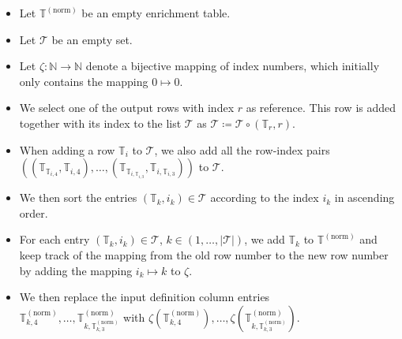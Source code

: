 \begin{itemize}
  \item Let $\mathbb{T}^{(\text{norm})}$ be an empty enrichment table.
  \item Let $\mathcal{T}$ be an empty set.
  \item Let $\zeta \colon \mathbb{N} \to \mathbb{N}$ denote a bijective mapping of index numbers, which initially only contains the mapping $0 \mapsto 0$.
  \item We select one of the output rows with index $r$ as reference. This row is added together with its index to the list $\mathcal{T}$ as $\mathcal{T} \coloneq \mathcal{T}\circ (\mathbb{T}_r, r)$.
  \item When adding a row $\mathbb{T}_i$ to $\mathcal{T}$, we also add all the row-index pairs $\left(\left(\mathbb{T}_{\mathbb{T}_{i,4}}, \mathbb{T}_{i,4} \right), \dots, \left( \mathbb{T}_{\mathbb{T}_{i,\mathbb{T}_{i,3}}}, \mathbb{T}_{i,\mathbb{T}_{i,3}} \right) \right)$ to $\mathcal{T}$.
  \item We then sort the entries $\left(\mathbb{T}_k, i_k\right)\in \mathcal{T}$ according to the index $i_k$ in ascending order.
  \item For each entry $\left(\mathbb{T}_k, i_k\right)\in \mathcal{T}$, $k\in \left(1, \dots, |\mathcal{T}|\right)$, we add $\mathbb{T}_k$ to $\mathbb{T}^{(\text{norm})}$ and keep track of the mapping from the old row number to the new row number by adding the mapping $i_k \mapsto k$ to $\zeta$.
  \item We then replace the input definition column entries \\$\mathbb{T}^{(\text{norm})}_{k, 4}, \dots, \mathbb{T}^{(\text{norm})}_{k, \mathbb{T}^{(\text{norm})}_{k, 3}}$ with $\zeta\left(\mathbb{T}^{(\text{norm})}_{k, 4}\right), \dots, \zeta\left(\mathbb{T}^{(\text{norm})}_{k, \mathbb{T}^{(\text{norm})}_{k, 3}}\right)$.
\end{itemize}


